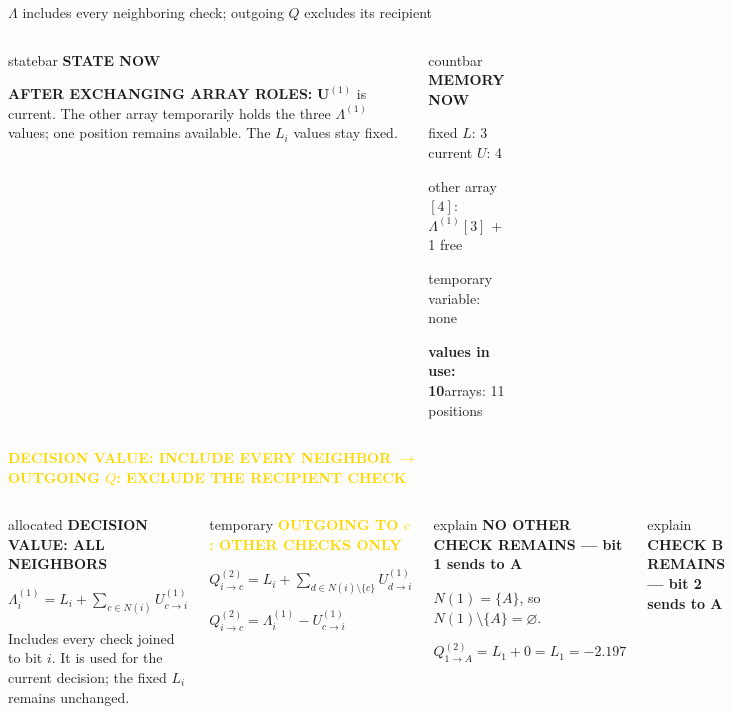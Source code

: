 \documentclass[aspectratio=169,9pt,t]{beamer}
\newcommand{\countstrip}[4]{%
  \begin{columns}[T,onlytextwidth]
    \column{.695\textwidth}
      \begin{beamercolorbox}[rounded=true,sep=.62ex]{statebar}
        \fontsize{6.4}{7.0}\selectfont\textcolor{Muted}{\bfseries STATE NOW}\par
        \vspace{.15ex}\scriptsize #1
      \end{beamercolorbox}
    \column{.285\textwidth}
      \begin{beamercolorbox}[rounded=true,sep=.52ex]{countbar}
        \fontsize{6.4}{7.0}\selectfont\textcolor{BP}{\bfseries MEMORY NOW}\par
        \fontsize{5.9}{6.6}\selectfont
        fixed $L$: 3 \quad current $U$: 4\par
        other array$[4]$: #2\par
        temporary variable: #3\par
        \textbf{values in use: #4}\quad arrays: 11 positions
      \end{beamercolorbox}
  \end{columns}\vspace{.6mm}}
\newcommand{\phase}[1]{%
  \centering\colorbox{GoldSoft}{\strut\scriptsize\bfseries\textcolor{Gold}{#1}}\par\vspace{1mm}}
\newcommand{\callout}[1]{%
  \begin{beamercolorbox}[rounded=true,sep=.65ex]{explain}
    \scriptsize #1
  \end{beamercolorbox}}
\begin{document}
\begin{frame}{\texorpdfstring{$\Lambda$}{Lambda} includes every neighboring check; outgoing \texorpdfstring{$Q$}{Q} excludes its recipient}
  \countstrip{\textbf{AFTER EXCHANGING ARRAY ROLES: }$\mathbf U^{(1)}$ is current. The other array temporarily holds the three $\Lambda^{(1)}$ values; one position remains available. The $L_i$ values stay fixed.}{$\Lambda^{(1)}[3]$ + 1 free}{none}{10}

  \phase{DECISION VALUE: INCLUDE EVERY NEIGHBOR \quad $\longrightarrow$ \quad OUTGOING $Q$: EXCLUDE THE RECIPIENT CHECK}

  \begin{columns}[T,onlytextwidth]
      \begin{beamercolorbox}[rounded=true,sep=.9ex]{allocated}
        \centering\scriptsize\textcolor{BP}{\bfseries DECISION VALUE: ALL NEIGHBORS}\par\vspace{.6mm}
        $\displaystyle
          \Lambda_i^{(1)}
            =L_i+\sum_{c\in N(i)}U^{(1)}_{c\to i}$\par\vspace{.6mm}
        Includes every check joined to bit $i$. It is used for the current decision; the fixed $L_i$ remains unchanged.
      \end{beamercolorbox}
      \vspace{1mm}
      \begin{beamercolorbox}[rounded=true,sep=.9ex]{temporary}
        \centering\scriptsize\textcolor{Gold}{\bfseries OUTGOING TO $c$: OTHER CHECKS ONLY}\par\vspace{.6mm}
        $\displaystyle
          Q^{(2)}_{i\to c}
            =L_i+\sum_{d\in N(i)\setminus\{c\}}U^{(1)}_{d\to i}$\par\vspace{.6mm}
        $\displaystyle Q^{(2)}_{i\to c}=\Lambda_i^{(1)}-U^{(1)}_{c\to i}$
      \end{beamercolorbox}
      \callout{\textbf{NO OTHER CHECK REMAINS --- bit 1 sends to A}\par\vspace{.4mm}
        $N(1)=\{A\}$, so $N(1)\setminus\{A\}=\varnothing$.\par
        \centering$\displaystyle Q^{(2)}_{1\to A}=L_1+0=L_1=-2.197$}
      \vspace{1mm}
      \callout{\textbf{CHECK B REMAINS --- bit 2 sends to A}\par\vspace{.4mm}
}
\end{columns}
\end{frame}
\end{document}
